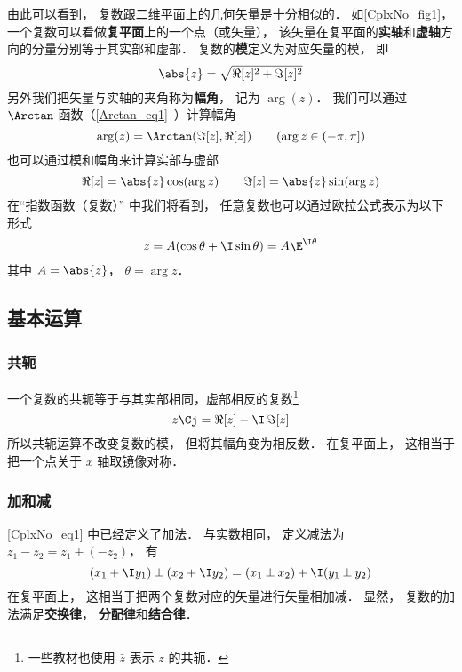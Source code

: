 由此可以看到， 复数跟二维平面上的几何矢量是十分相似的． 如\autoref{CplxNo_fig1}， 一个复数可以看做\textbf{复平面}上的一个点（或矢量）， 该矢量在复平面的\textbf{实轴}和\textbf{虚轴}方向的分量分别等于其实部和虚部． 复数的\textbf{模}定义为对应矢量的模， 即
\begin{equation}
\abs{z} = \sqrt{\Re[z]^2 + \Im[z]^2}
\end{equation}
另外我们把矢量与实轴的夹角称为\textbf{幅角}， 记为 $\arg(z)$． 我们可以通过 $\Arctan$ 函数（\autoref{Arctan_eq1}~）计算幅角
\begin{equation}
\arg(z) = \Arctan(\Im[z], \Re[z])
\qquad (\arg z \in (-\pi, \pi])
\end{equation}
也可以通过模和幅角来计算实部与虚部
\begin{equation}
\Re[z] = \abs{z}\cos(\arg z) \qquad \Im[z] = \abs{z}\sin(\arg z)
\end{equation}
在“指数函数（复数）” 中我们将看到， 任意复数也可以通过欧拉公式表示为以下形式
\begin{equation}
z = A(\cos\theta + \I\sin\theta) = A\E^{\I\theta}
\end{equation}
其中 $A = \abs{z}$， $\theta = \arg z$．

\subsection{基本运算}
\subsubsection{共轭}
一个复数的共轭等于与其实部相同，虚部相反的复数\footnote{一些教材也使用 $\bar z$ 表示 $z$ 的共轭．}
\begin{equation}\label{CplxNo_eq6}
z\Cj = \Re[z] - \I\, \Im[z]
\end{equation}
所以共轭运算不改变复数的模， 但将其幅角变为相反数． 在复平面上， 这相当于把一个点关于 $x$ 轴取镜像对称．

\subsubsection{加和减}
\autoref{CplxNo_eq1} 中已经定义了加法． 与实数相同， 定义减法为 $z_1 - z_2 = z_1 + (-z_2)$， 有
\begin{equation}
(x_1 + \I y_1) \pm (x_2 + \I y_2) = (x_1 \pm x_2) + \I (y_1 \pm y_2)
\end{equation}
在复平面上， 这相当于把两个复数对应的矢量进行矢量相加减． 显然， 复数的加法满足\textbf{交换律}， \textbf{分配律}和\textbf{结合律}．

